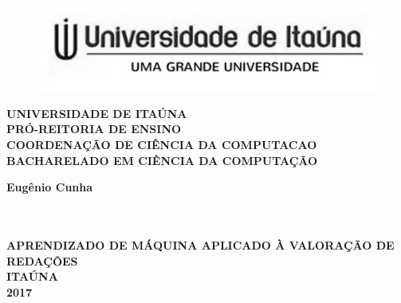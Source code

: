 \thispagestyle{empty}

\vfill
 \begin{center}
    \begin{figure}[t]
     \centering
            \includegraphics[width=15cm]{figuras/logo-uit.pdf}\\[-0.1in]
     \end{figure}

    {\large\bfseries UNIVERSIDADE DE ITAÚNA} \\
    {\large\bfseries PRÓ-REITORIA DE ENSINO} \\
    {\large\bfseries COORDENAÇÃO DE CIÊNCIA DA COMPUTACAO}  \\ 
    {\large\bfseries BACHARELADO EM CIÊNCIA DA COMPUTAÇÃO}  \\ 

    \vspace*{1in}
    \begin{large} \bfseries Eugênio Cunha\end{large}\\[0.4in]

    \vspace*{4cm}
    \noindent \\
    \large\bfseries{APRENDIZADO DE MÁQUINA APLICADO À VALORAÇÃO DE REDAÇÕES} \\
    \vfill
    \large\bfseries{ ITAÚNA \\ 2017}
\end{center}

\normalsize